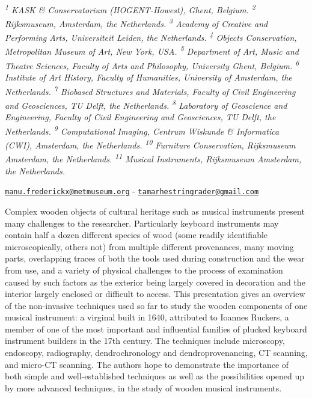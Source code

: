\documentclass[
]{book}
\begin{document}
\emph{\textsuperscript{1} KASK \& Conservatorium (HOGENT-Howest), Ghent, Belgium. \textsuperscript{2} Rijksmuseum, Amsterdam, the Netherlands. \textsuperscript{3} Academy of Creative and Performing Arts, Universiteit Leiden, the Netherlands. \textsuperscript{4} Objects Conservation, Metropolitan Museum of Art, New York, USA. \textsuperscript{5} Department of Art, Music and Theatre Sciences, Faculty of Arts and Philosophy, University Ghent, Belgium. \textsuperscript{6} Institute of Art History, Faculty of Humanities, University of Amsterdam, the Netherlands. \textsuperscript{7} Biobased Structures and Materials, Faculty of Civil Engineering and Geosciences, TU Delft, the Netherlands. \textsuperscript{8} Laboratory of Geoscience and Engineering, Faculty of Civil Engineering and Geosciences, TU Delft, the Netherlands. \textsuperscript{9} Computational Imaging, Centrum Wiskunde \& Informatica (CWI), Amsterdam, the Netherlands. \textsuperscript{10} Furniture Conservation, Rijksmuseum Amsterdam, the Netherlands. \textsuperscript{11} Musical Instruments, Rijksmuseum Amsterdam, the Netherlands.}

\href{mailto:manu.frederickx@metmuseum.org}{\nolinkurl{manu.frederickx@metmuseum.org}} - \href{mailto:tamarhestringrader@gmail.com}{\nolinkurl{tamarhestringrader@gmail.com}}

Complex wooden objects of cultural heritage such as musical instruments present many challenges to the researcher. Particularly keyboard instruments may contain half a dozen different species of wood (some readily identifiable microscopically, others not) from multiple different provenances, many moving parts, overlapping traces of both the tools used during construction and the wear from use, and a variety of physical challenges to the process of examination caused by such factors as the exterior being largely covered in decoration and the interior largely enclosed or difficult to access. This presentation gives an overview of the non-invasive techniques used so far to study the wooden components of one musical instrument: a virginal built in 1640, attributed to Ioannes Ruckers, a member of one of the most important and influential families of plucked keyboard instrument builders in the 17th century. The techniques include microscopy, endoscopy, radiography, dendrochronology and dendroprovenancing, CT scanning, and micro-CT scanning. The authors hope to demonstrate the importance of both simple and well-established techniques as well as the possibilities opened up by more advanced techniques, in the study of wooden musical instruments.
\end{document}
